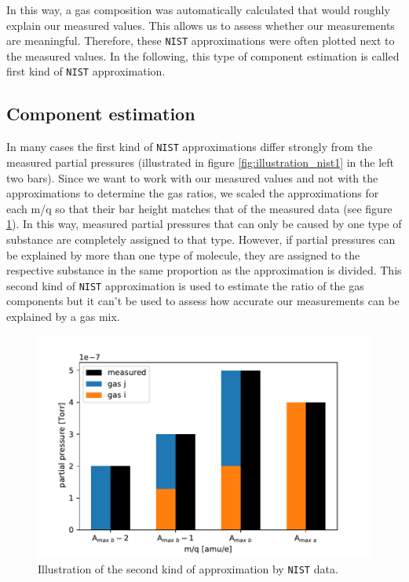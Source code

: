 In this way, a gas composition was automatically calculated that would roughly explain our measured values. This allows us to assess whether our measurements are meaningful. Therefore, these \texttt{NIST} approximations were often plotted next to the measured values. In the following, this type of component estimation is called first kind of \texttt{NIST} approximation. 

\subsection{Component estimation}

In many cases the first kind of \texttt{NIST} approximations differ strongly from the measured partial pressures (illustrated in figure \ref{fig:illustration_nist1} in the left two bars). Since we want to work with our measured values and not with the approximations to determine the gas ratios, we scaled the approximations for each m/q so that their bar height matches that of the measured data (see figure \ref{fig:illustration_nist2}). In this way, measured partial pressures that can only be caused by one type of substance are completely assigned to that type. However, if partial pressures can be explained by more than one type of molecule, they are assigned to the respective substance in the same proportion as the approximation is divided. This second kind of \texttt{NIST} approximation is used to estimate the ratio of the gas components but it can't be used to assess how accurate our measurements can be explained by a gas mix. 

\begin{figure}[h!]
    \centering
    \includegraphics[width=\textwidth]{Report/DataResultsPlots/ilustration_nist_approx2.pdf}
    \caption{Illustration of the second kind of approximation by \texttt{NIST} data. }
    \label{fig:illustration_nist2}
\end{figure}

